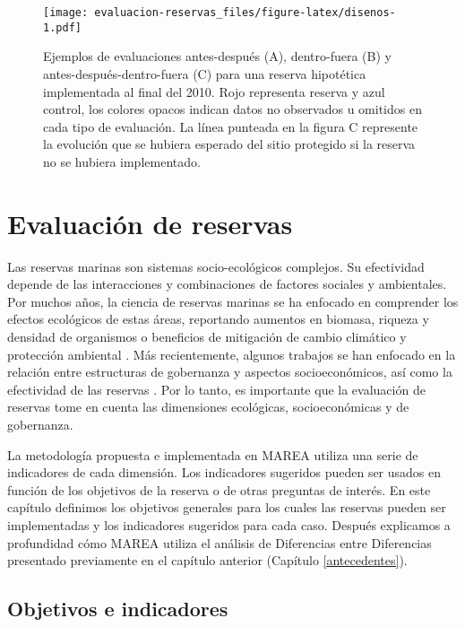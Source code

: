 \documentclass[]{krantz}
\begin{document}
\begin{figure}
\centering
\texttt{[image: evaluacion-reservas\_files/figure-latex/disenos-1.pdf]}
\caption{\label{fig:disenos}Ejemplos de evaluaciones antes-después (A), dentro-fuera (B) y antes-después-dentro-fuera (C) para una reserva hipotética implementada al final del 2010. Rojo representa reserva y azul control, los colores opacos indican datos no observados u omitidos en cada tipo de evaluación. La línea punteada en la figura C represente la evolución que se hubiera esperado del sitio protegido si la reserva no se hubiera implementado.}
\end{figure}

\hypertarget{evaluacion-de-reservas}{%
\chapter{Evaluación de reservas}\label{evaluacion-de-reservas}}

Las reservas marinas son sistemas socio-ecológicos complejos. Su efectividad depende de las interacciones y combinaciones de factores sociales y ambientales. Por muchos años, la ciencia de reservas marinas se ha enfocado en comprender los efectos ecológicos de estas áreas, reportando aumentos en biomasa, riqueza y densidad de organismos o beneficios de mitigación de cambio climático y protección ambiental \citep{lester_2009, micheli_2012, giakoumi_2017, sala_2017, roberts_2017}. Más recientemente, algunos trabajos se han enfocado en la relación entre estructuras de gobernanza y aspectos socioeconómicos, así como la efectividad de las reservas \citep{halpern_2013, lpezangarita_2014, mascia_2017}. Por lo tanto, es importante que la evaluación de reservas tome en cuenta las dimensiones ecológicas, socioeconómicas y de gobernanza.

La metodología propuesta e implementada en MAREA utiliza una serie de indicadores de cada dimensión. Los indicadores sugeridos pueden ser usados en función de los objetivos de la reserva o de otras preguntas de interés. En este capítulo definimos los objetivos generales para los cuales las reservas pueden ser implementadas y los indicadores sugeridos para cada caso. Después explicamos a profundidad cómo MAREA utiliza el análisis de Diferencias entre Diferencias presentado previamente en el capítulo anterior (Capítulo \ref{antecedentes}).

\hypertarget{objetivos-e-indicadores}{%
\section{Objetivos e indicadores}\label{objetivos-e-indicadores}}
\end{document}
